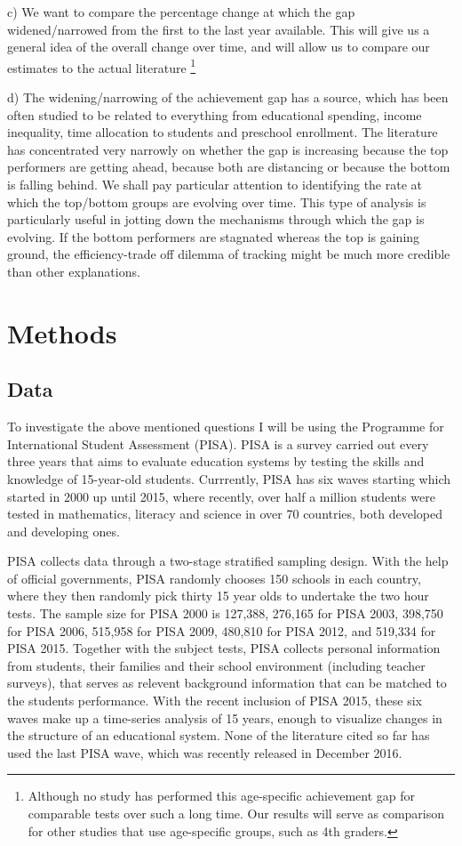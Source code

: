 \documentclass[11pt, a4paper]{article}\usepackage[]{graphicx}\usepackage[]{color}
\begin{document}
c) We want to compare the percentage change at which the gap widened/narrowed from the first to the last year available. This will give us a general idea of the overall change over time, and will allow us to compare our estimates to the actual literature \footnote{Although no study has performed this age-specific achievement gap for comparable tests over such a long time. Our results will serve as comparison for other studies that use age-specific groups, such as 4th graders.}

d) The widening/narrowing of the achievement gap has a source, which has been often studied to be related to everything from educational spending, income inequality, time allocation to students and preschool enrollment. The literature has concentrated very narrowly on whether the gap is increasing because the top performers are getting ahead, because both are distancing or because the bottom is falling behind. We shall pay particular attention to identifying the rate at which the top/bottom groups are evolving over time. This type of analysis is particularly useful in jotting down the mechanisms through which the gap is evolving. If the bottom performers are stagnated whereas the top is gaining ground, the efficiency-trade off dilemma of tracking might be much more credible than other explanations.

\section{Methods}

\subsection{Data}



To investigate the above mentioned questions I will be using the Programme for International Student Assessment (PISA). PISA is a survey carried out every three years that aims to evaluate education systems by testing the skills and knowledge of 15-year-old students. Currrently, PISA has six waves starting which started in 2000 up until 2015, where recently, over half a million students were tested in mathematics, literacy and science in over 70 countries, both developed and developing ones.

PISA collects data through a two-stage stratified sampling design. With the help of official governments, PISA randomly chooses 150 schools in each country, where they then randomly pick thirty 15 year olds to undertake the two hour tests. The sample size for PISA 2000 is 127,388, 276,165 for PISA 2003, 398,750 for PISA 2006, 515,958 for PISA 2009, 480,810 for PISA 2012, and 519,334 for PISA 2015. Together with the subject tests, PISA collects personal information from students, their families and their school environment (including teacher surveys), that serves as relevent background information that can be matched to the students performance. With the recent inclusion of PISA 2015, these six waves make up a time-series analysis of 15 years, enough to visualize changes in the structure of an educational system. None of the literature cited so far has used the last PISA wave, which was recently released in December 2016.
\end{document}
